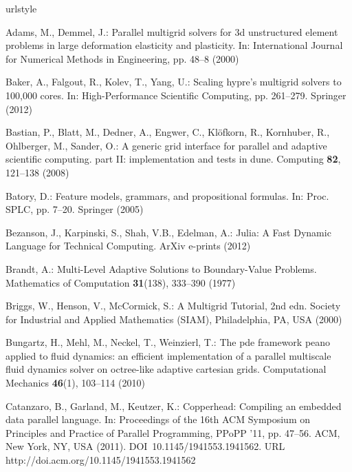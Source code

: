 \documentclass[onecolumn]{svjour3}
\begin{document}
\begin{thebibliography}{10}
\providecommand{\url}[1]{{#1}}
\providecommand{\urlprefix}{URL }
\expandafter\ifx\csname urlstyle\endcsname\relax
  \providecommand{\doi}[1]{DOI~\discretionary{}{}{}#1}\else
  \providecommand{\doi}{DOI~\discretionary{}{}{}\begingroup
  \urlstyle{rm}\Url}\fi

Adams, M., Demmel, J.: Parallel multigrid solvers for 3d unstructured element
  problems in large deformation elasticity and plasticity.
\newblock In: International Journal for Numerical Methods in Engineering, pp.
  48--8 (2000)

Baker, A., Falgout, R., Kolev, T., Yang, U.: Scaling hypre's multigrid solvers
  to 100,000 cores.
\newblock In: High-Performance Scientific Computing, pp. 261--279. Springer
  (2012)

Bastian, P., Blatt, M., Dedner, A., Engwer, C., Kl\"ofkorn, R., Kornhuber, R.,
  Ohlberger, M., Sander, O.: A generic grid interface for parallel and adaptive
  scientific computing. part {II}: implementation and tests in dune.
\newblock Computing \textbf{82}, 121--138 (2008)

Batory, D.: Feature models, grammars, and propositional formulas.
\newblock In: Proc. SPLC, pp. 7--20. Springer (2005)

{Bezanson}, J., {Karpinski}, S., {Shah}, V.B., {Edelman}, A.: {Julia: A Fast
  Dynamic Language for Technical Computing}.
\newblock ArXiv e-prints  (2012)

Brandt, A.: {Multi-Level Adaptive Solutions to Boundary-Value Problems}.
\newblock Mathematics of Computation \textbf{31}(138), 333--390 (1977)

Briggs, W., Henson, V., McCormick, S.: A Multigrid Tutorial, 2nd edn.
\newblock Society for Industrial and Applied Mathematics (SIAM), Philadelphia,
  PA, USA (2000)

Bungartz, H., Mehl, M., Neckel, T., Weinzierl, T.: The pde framework peano
  applied to fluid dynamics: an efficient implementation of a parallel
  multiscale fluid dynamics solver on octree-like adaptive cartesian grids.
\newblock Computational Mechanics \textbf{46}(1), 103--114 (2010)

Catanzaro, B., Garland, M., Keutzer, K.: Copperhead: Compiling an embedded data
  parallel language.
\newblock In: Proceedings of the 16th ACM Symposium on Principles and Practice
  of Parallel Programming, PPoPP '11, pp. 47--56. ACM, New York, NY, USA
  (2011).
\newblock \doi{10.1145/1941553.1941562}.
\newblock \urlprefix\url{http://doi.acm.org/10.1145/1941553.1941562}


\end{thebibliography}
\end{document}

